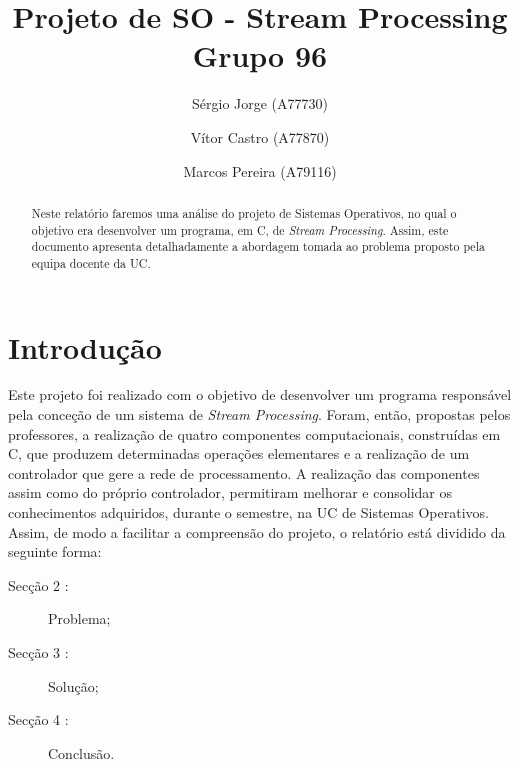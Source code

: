 \documentclass[a4paper]{article}
\title{Projeto de SO - Stream Processing\\Grupo 96}
\author{Sérgio Jorge (A77730) \and Vítor Castro (A77870) \and Marcos Pereira (A79116)}
\date{}
\begin{document}
\maketitle

\begin{abstract}
Neste relatório faremos uma análise do projeto de Sistemas Operativos, no qual o objetivo era desenvolver um programa, em C, de \textit{Stream Processing}. Assim, este documento apresenta detalhadamente a abordagem tomada ao problema proposto pela equipa docente da UC.
\end{abstract}

\tableofcontents

\section{Introdução}
\label{sec:intro}

Este projeto foi realizado com o objetivo de desenvolver um programa responsável pela conceção de um sistema de \textit{Stream Processing}. Foram, então, propostas pelos professores, a realização de quatro componentes computacionais, construídas em C, que produzem determinadas operações elementares e a realização de um controlador que gere a rede de processamento. A realização das componentes assim como do próprio controlador, permitiram melhorar e consolidar os conhecimentos adquiridos, durante o semestre, na UC de Sistemas Operativos.
Assim, de modo a facilitar a compreensão do projeto, o relatório está dividido da seguinte forma:

\begin{description}
    \item[Secção 2 :] Problema;
    \item[Secção 3 :] Solução;
    \item[Secção 4 :] Conclusão.
\end{description}
\pagebreak
\end{document}
